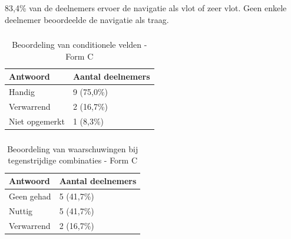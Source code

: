 83,4\% van de deelnemers ervoer de navigatie als vlot of zeer vlot. Geen enkele deelnemer beoordeelde de navigatie als traag.

\subsubsection{}

\begin{table}[h]
  \centering
  \caption[Beoordeling conditionele velden Form C]{Beoordeling van conditionele velden - Form C}
  \label{tab:laat-formc-conditioneel}
  \begin{tabular}{ll}
    \hline
    \textbf{Antwoord} & \textbf{Aantal deelnemers} \\
    \hline
    Handig         & 9 (75,0\%) \\
    Verwarrend     & 2 (16,7\%) \\
    Niet opgemerkt & 1 (8,3\%)  \\
    \hline
  \end{tabular}
\end{table}

\subsubsection{}

\begin{table}[h]
  \centering
  \caption[Beoordeling waarschuwingen Form C]{Beoordeling van waarschuwingen bij tegenstrijdige combinaties - Form C}
  \label{tab:laat-formc-waarschuwingen}
  \begin{tabular}{ll}
    \hline
    \textbf{Antwoord} & \textbf{Aantal deelnemers} \\
    \hline
    Geen gehad   & 5 (41,7\%) \\
    Nuttig       & 5 (41,7\%) \\
    Verwarrend   & 2 (16,7\%) \\
    \hline
  \end{tabular}
\end{table}

\subsection{}

